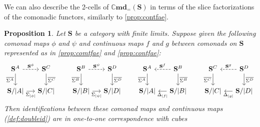 \documentclass[11pt, oneside, article]{memoir}
\theoremstyle{plain}
\newtheorem{proposition}[theorem]{Proposition}
\theoremstyle{definition}
\theoremstyle{remark}
\DeclarePairedDelimiter{\abs}{\lvert}{\rvert}
\newcommand{\namedcat}[1]{\mathbf{#1}}
\newcommand{\cat}[1]{\mathbf{#1}}
\newcommand{\Cmd}{\mathbb{C}\namedcat{md}}
\newcommand{\CmdId}{\Cmd_=}
\newcommand{\CoalgOn}[2]{{#2}^{#1}}
\newcommand{\CoalgS}[1]{\CoalgOn{#1}{\bS}}
\newcommand{\pts}[1]{{\abs{#1}}}
\newcommand{\one}[1]{\pts{#1}}
\newcommand{\ptlift}[1]{\overline{#1}}
\newcommand{\carr}{\Sigma}
\newcommand{\leindex}[1]{\Sigma_{#1}}
\newcommand{\reindex}[1]{\Delta_{#1}}
\newcommand{\car}[1]{\carr^{#1}}
\newcommand{\carA}{\car{\cA}}
\newcommand{\carB}{\car{\cB}}
\newcommand{\carC}{\car{\cC}}
\newcommand{\carD}{\car{\cD}}
\newcommand{\com}[2]{{#1}^{#2}}
\newcommand{\con}[2]{{#1}^{#2}}
\newcommand{\cmnd}[1]{{#1}}
\newcommand{\cA}{\cmnd{A}}
\newcommand{\cB}{\cmnd{B}}
\newcommand{\cC}{\cmnd{C}}
\newcommand{\cD}{\cmnd{D}}
\newcommand{\bS}{\cat{S}}
\newcommand{\AS}{\CoalgS{\cA}}
\newcommand{\BS}{\CoalgS{\cB}}
\newcommand{\CS}{\CoalgS{\cC}}
\newcommand{\DS}{\CoalgS{\cD}}
\newcommand{\SA}{\bS/\pts{\cA}}
\newcommand{\SB}{\bS/\pts{\cB}}
\newcommand{\SC}{\bS/\pts{\cC}}
\newcommand{\SD}{\bS/\pts{\cD}}
\begin{document}
We can also describe the 2-cells of $\CmdId(\bS)$ in terms of the
slice factorizations of the comonadic functors, similarly to
\cref{prop:contfae}.

\begin{proposition}\label{prop:cmdtfae}
  Let $\bS$ be a category with finite limits.  Suppose given the
  following comonad maps $\phi$ and $\psi$ and continuous maps $f$ and
  $g$ between comonads on $\bS$ represented as in \cref{prop:comtfae}
  and \cref{prop:contfae}:
  \[
    \begin{tikzcd}[column sep=12.5]
      \AS & \CS \\
      {\SA} & {\SC}
      \arrow["{\com{\bS}{\phi}}", dashed, from=1-1, to=1-2]
      \arrow["{\ptlift{\carA}}"', from=1-1, to=2-1]
      \arrow["{\ptlift{\carC}}", from=1-2, to=2-2]
      \arrow["{\leindex{\one{\phi}}}"', from=2-1, to=2-2]
    \end{tikzcd}
    \hspace{6.5mm}
    \begin{tikzcd}[column sep=12.5]
      \BS & \DS \\
      {\SB} & {\SD}
      \arrow["{\com{\bS}{\psi}}", dashed, from=1-1, to=1-2]
      \arrow["{\ptlift{\carB}}"', from=1-1, to=2-1]
      \arrow["{\ptlift{\carD}}", from=1-2, to=2-2]
      \arrow["{\leindex{\one{\psi}}}"', from=2-1, to=2-2]
    \end{tikzcd}
    \hspace{6.5mm}
    \begin{tikzcd}[column sep=12.5]
      \AS & \BS \\
      {\SA} & {\SB}
      \arrow["\ptlift{\carA}"', from=1-1, to=2-1]
      \arrow["{\con{\bS}{f}}"', dashed, from=1-2, to=1-1]
      \arrow["\ptlift{\carB}", from=1-2, to=2-2]
      \arrow["{\reindex{\one{f}}}", from=2-2, to=2-1]
    \end{tikzcd}
    \hspace{6.5mm}
    \begin{tikzcd}[column sep=12.5]
      \CS & \DS \\
      {\SC} & {\SD}
      \arrow["\ptlift{\carC}"', from=1-1, to=2-1]
      \arrow["{\con{\bS}{g}}"', dashed, from=1-2, to=1-1]
      \arrow["\ptlift{\carD}", from=1-2, to=2-2]
      \arrow["{\reindex{\one{g}}}", from=2-2, to=2-1]
    \end{tikzcd}
  \]
  Then identifications between these comonad maps and continuous maps
  (\cref{def:doubleid}) are in one-to-one correspondence with
  cubes
  \[
    \begin{tikzcd}[column sep=17]

\end{tikzcd}\]
\end{proposition}
\end{document}
